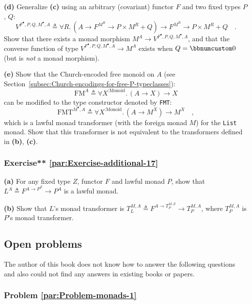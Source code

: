 \textbf{(d)} Generalize \textbf{(c)} using an arbitrary (covariant)
functor $F$ and two fixed types $P$, $Q$:
\[
V^{F^{\bullet},P,Q,M^{\bullet},A}\triangleq\forall R.\,(A\rightarrow F^{M^{R}}\rightarrow P\times M^{R}+Q)\rightarrow F^{M^{R}}\rightarrow P\times M^{R}+Q\quad.
\]
Show that there exists a monad morphism $M^{A}\rightarrow V^{F^{\bullet},P,Q,M^{\bullet},A}$,
and that the converse function of type $V^{F^{\bullet},P,Q,M^{\bullet},A}\rightarrow M^{A}$
exists when $Q=\bbnum 0$ (but is \emph{not} a monad morphism).

\textbf{(e)} Show that the Church-encoded free monoid on $A$ (see
Section~\ref{subsec:Church-encodings-for-free-P-typeclasses}):
\[
\text{FM}^{A}\triangleq\forall X^{:\text{Monoid}}.\,(A\rightarrow X)\rightarrow X
\]
can be modified to the type constructor denoted by \lstinline!FMT!:
\[
\text{FMT}^{M^{\bullet},A}\triangleq\forall X^{:\text{Monoid}}.\,(A\rightarrow M^{X})\rightarrow M^{X}\quad,
\]
which is a lawful monad transformer (with the foreign monad $M$)
for the \lstinline!List! monad. Show that this transformer is not
equivalent to the transformers defined in \textbf{(b)}, \textbf{(c)}. 

\subsubsection{Exercise{*}{*} \label{par:Exercise-additional-17}\ref{par:Exercise-additional-17}}

\textbf{(a)} For any fixed type $Z$, functor $F$ and lawful monad
$P$, show that $L^{A}\triangleq F^{A\rightarrow P^{Z}}\rightarrow P^{A}$
is a lawful monad.

\textbf{(b)} Show that $L$\textsf{'}s monad transformer is $T_{L}^{M,A}\triangleq F^{A\rightarrow T_{P}^{M,Z}}\rightarrow T_{P}^{M,A}$,
where $T_{P}^{M,A}$ is $P$\textsf{'}s monad transformer.

\subsection{Open problems}

The author of this book does not know how to answer the following
questions and also could not find any answers in existing books or
papers.

\subsubsection{Problem \label{par:Problem-monads-1}\ref{par:Problem-monads-1}}

